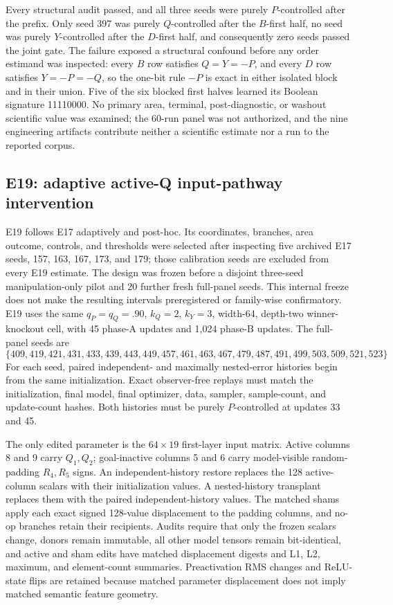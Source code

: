 \documentclass[11pt,a4paper]{article}
\begin{document}
Every structural audit passed, and all three seeds were purely $P$-controlled after the prefix. Only seed 397 was purely $Q$-controlled after the $B$-first half, no seed was purely $Y$-controlled after the $D$-first half, and consequently zero seeds passed the joint gate. The failure exposed a structural confound before any order estimand was inspected: every $B$ row satisfies $Q=Y=-P$, and every $D$ row satisfies $Y=-P=-Q$, so the one-bit rule $-P$ is exact in either isolated block and in their union. Five of the six blocked first halves learned its Boolean signature 11110000. No primary area, terminal, post-diagnostic, or washout scientific value was examined; the 60-run panel was not authorized, and the nine engineering artifacts contribute neither a scientific estimate nor a run to the reported corpus.

\subsection{E19: adaptive active-Q input-pathway intervention}

E19 follows E17 adaptively and post-hoc. Its coordinates, branches, area outcome, controls, and thresholds were selected after inspecting five archived E17 seeds, 157, 163, 167, 173, and 179; those calibration seeds are excluded from every E19 estimate. The design was frozen before a disjoint three-seed manipulation-only pilot and 20 further fresh full-panel seeds. This internal freeze does not make the resulting intervals preregistered or family-wise confirmatory. E19 uses the same $q_P=q_Q=.90$, $k_Q=2$, $k_Y=3$, width-64, depth-two winner-knockout cell, with 45 phase-A updates and 1,024 phase-B updates. The full-panel seeds are
\[
\{409,419,421,431,433,439,443,449,457,461,463,467,479,487,491,499,503,509,521,523\}
\]
For each seed, paired independent- and maximally nested-error histories begin from the same initialization. Exact observer-free replays must match the initialization, final model, final optimizer, data, sampler, sample-count, and update-count hashes. Both histories must be purely $P$-controlled at updates 33 and 45.

The only edited parameter is the $64\times19$ first-layer input matrix. Active columns 8 and 9 carry $Q_1,Q_2$; goal-inactive columns 5 and 6 carry model-visible random-padding $R_4,R_5$ signs. An independent-history restore replaces the 128 active-column scalars with their initialization values. A nested-history transplant replaces them with the paired independent-history values. The matched shams apply each exact signed 128-value displacement to the padding columns, and no-op branches retain their recipients. Audits require that only the frozen scalars change, donors remain immutable, all other model tensors remain bit-identical, and active and sham edits have matched displacement digests and L1, L2, maximum, and element-count summaries. Preactivation RMS changes and ReLU-state flips are retained because matched parameter displacement does not imply matched semantic feature geometry.
\end{document}
